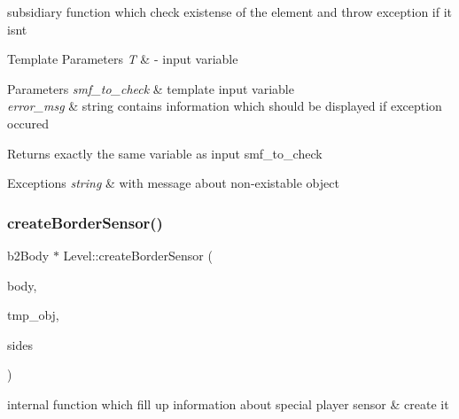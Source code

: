 subsidiary function which check existense of the element and throw exception if it isn\textquotesingle{}t 


\begin{DoxyTemplParams}{Template Parameters}
{\em T} & -\/ input variable \\
\hline
\end{DoxyTemplParams}

\begin{DoxyParams}{Parameters}
{\em smf\+\_\+to\+\_\+check} & template input variable \\
\hline
{\em error\+\_\+msg} & string contains information which should be displayed if exception occured \\
\hline
\end{DoxyParams}
\begin{DoxyReturn}{Returns}
exactly the same variable as input \textquotesingle{}smf\+\_\+to\+\_\+check\textquotesingle{} 
\end{DoxyReturn}

\begin{DoxyExceptions}{Exceptions}
{\em string} & with message about non-\/existable object \\
\hline
\end{DoxyExceptions}
\mbox{\label{class_level_a87d0a007fafb7f51a1410f6f7114b699}} 
\subsubsection{\texorpdfstring{create\+Border\+Sensor()}{createBorderSensor()}}
{\footnotesize\ttfamily b2\+Body $\ast$ Level\+::create\+Border\+Sensor (\begin{DoxyParamCaption}\item[{b2\+Body $\ast$}]{body,  }\item[{\hyperlink{class_object}{Object} $\ast$}]{tmp\+\_\+obj,  }\item[{\hyperlink{_level_8h_aa8656d997df416abfebfcf4b3041f01c}{Sides}}]{sides }\end{DoxyParamCaption})\hspace{0.3cm}{\ttfamily [private]}}



internal function which fill up information about special player sensor \& create it 


